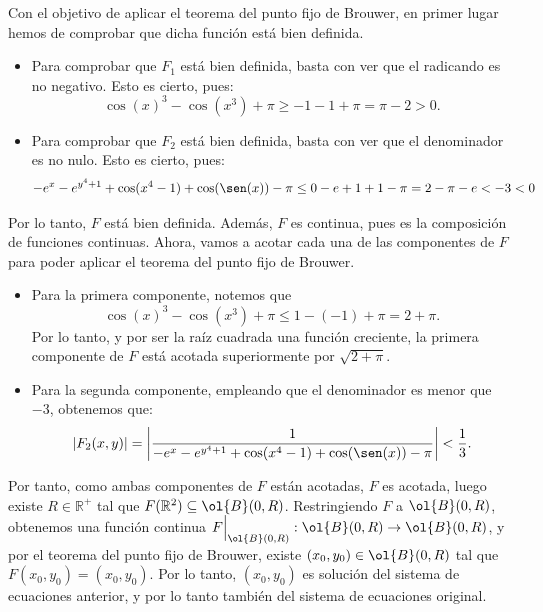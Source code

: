 \documentclass[12pt]{article}
\begin{document}
\begin{ejercicio}[2 puntos]
        Con el objetivo de aplicar el teorema del punto fijo de Brouwer, en primer lugar hemos de comprobar que dicha función está bien definida.
        \begin{itemize}
            \item Para comprobar que $F_1$ está bien definida, basta con ver que el radicando es no negativo. Esto es cierto, pues:
            \begin{equation*}
                \cos(x)^3 - \cos(x^3) + \pi \geq -1 - 1 + \pi = \pi - 2 > 0.
            \end{equation*}
            \item Para comprobar que $F_2$ está bien definida, basta con ver que el denominador es no nulo. Esto es cierto, pues:
            \begin{equation*}
                -e^x - e^{y^4+1}+\cos(x^4-1)+\cos(\sen(x)) -\pi \leq 0-e+1+1-\pi = 2-\pi-e < -3<0
            \end{equation*}
        \end{itemize}

        Por lo tanto, $F$ está bien definida. Además, $F$ es continua, pues es la composición de funciones continuas. Ahora, vamos a acotar cada una de las componentes de $F$ para poder aplicar el teorema del punto fijo de Brouwer.
        \begin{itemize}
            \item Para la primera componente, notemos que
            \begin{equation*}
                \cos(x)^3 - \cos(x^3) + \pi \leq 1 - (-1) + \pi = 2 + \pi.
            \end{equation*}
            Por lo tanto, y por ser la raíz cuadrada una función creciente, la primera componente de $F$ está acotada superiormente por $\sqrt{2+\pi}$.
            \item Para la segunda componente, empleando que el denominador es menor que $-3$, obtenemos que:
            \begin{equation*}
                |F_2(x,y)| = \left|\dfrac{1}{-e^x - e^{y^4+1}+\cos(x^4-1)+\cos(\sen(x)) -\pi}\right| < \dfrac{1}{3}.
            \end{equation*}
        \end{itemize}

        Por tanto, como ambas componentes de $F$ están acotadas, $F$ es acotada, luego existe $R\in \mathbb{R}^+$ tal que $F(\mathbb{R}^2)\subseteq \ol{B}(0,R)$. Restringiendo $F$ a $\ol{B}(0,R)$, obtenemos una función continua $F\Big|_{\ol{B}(0,R)}:\ol{B}(0,R)\to \ol{B}(0,R)$, y por el teorema del punto fijo de Brouwer, existe $(x_0,y_0)\in \ol{B}(0,R)$ tal que $F(x_0,y_0)=(x_0,y_0)$. Por lo tanto, $(x_0,y_0)$ es solución del sistema de ecuaciones anterior, y por lo tanto también del sistema de ecuaciones original.
    \end{ejercicio}
\end{document}

